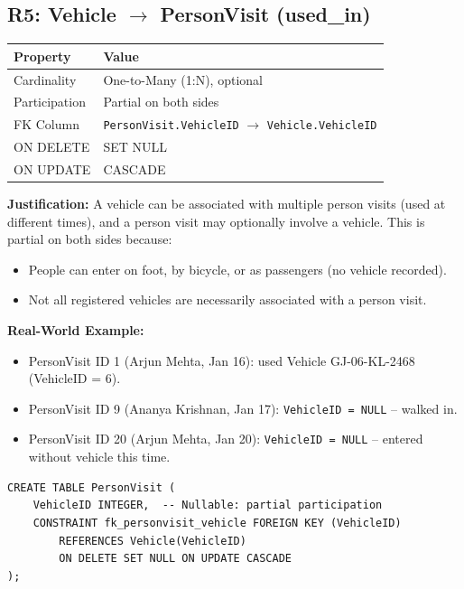 \documentclass[a4paper, 12pt]{article}
\begin{document}
\subsection{R5: Vehicle \texorpdfstring{$\rightarrow$}{->} PersonVisit (used\_in)}

\begin{table}[H]
\centering
\small
\begin{tabularx}{\textwidth}{l X}
\toprule
\textbf{Property} & \textbf{Value} \\
\midrule
Cardinality & One-to-Many (1:N), optional \\
Participation & Partial on both sides \\
FK Column & \texttt{PersonVisit.VehicleID} $\rightarrow$ \texttt{Vehicle.VehicleID} \\
ON DELETE & SET NULL \\
ON UPDATE & CASCADE \\
\bottomrule
\end{tabularx}
\end{table}

\textbf{Justification:} A vehicle can be associated with multiple person visits (used at different times), and a person visit may optionally involve a vehicle. This is partial on both sides because:
\begin{itemize}[leftmargin=*, nosep]
    \item People can enter on foot, by bicycle, or as passengers (no vehicle recorded).
    \item Not all registered vehicles are necessarily associated with a person visit.
\end{itemize}

\textbf{Real-World Example:}
\begin{itemize}[leftmargin=*, nosep]
    \item PersonVisit ID 1 (Arjun Mehta, Jan 16): used Vehicle GJ-06-KL-2468 (VehicleID = 6).
    \item PersonVisit ID 9 (Ananya Krishnan, Jan 17): \texttt{VehicleID = NULL} -- walked in.
    \item PersonVisit ID 20 (Arjun Mehta, Jan 20): \texttt{VehicleID = NULL} -- entered without vehicle this time.
\end{itemize}

\begin{lstlisting}[style=sqlstyle, caption={R5 Implementation}, label={lst:r5}]
CREATE TABLE PersonVisit (
    VehicleID INTEGER,  -- Nullable: partial participation
    CONSTRAINT fk_personvisit_vehicle FOREIGN KEY (VehicleID)
        REFERENCES Vehicle(VehicleID)
        ON DELETE SET NULL ON UPDATE CASCADE
);
\end{lstlisting}
\end{document}
